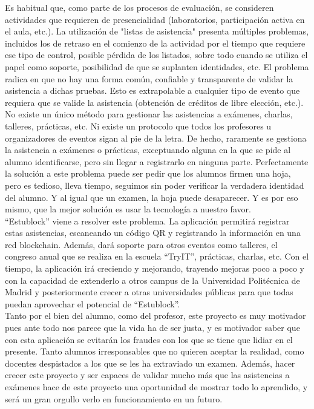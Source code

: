   Es habitual que, como parte de los procesos de evaluación, se consideren actividades que requieren de presencialidad (laboratorios, participación activa en el aula, etc.). La utilización de "listas de asistencia" presenta múltiples problemas, incluidos los de retraso en el comienzo de la actividad por el tiempo que requiere ese tipo de control, posible pérdida de los listados, sobre todo cuando se utiliza el papel como soporte, posibilidad de que se suplanten identidades, etc. El problema radica en que no hay una forma común, confiable y transparente de validar la asistencia a dichas pruebas. Esto es extrapolable a cualquier tipo de evento que requiera que se valide la asistencia (obtención de créditos de libre elección, etc.). \\

  No existe un único método para gestionar las asistencias a exámenes, charlas, talleres, prácticas, etc. Ni existe un protocolo que todos los profesores u organizadores de eventos sigan al pie de la letra. De hecho, raramente se gestiona la asistencia a exámenes o prácticas, exceptuando alguna en la que se pide al alumno identificarse, pero sin llegar a registrarlo en ninguna parte. Perfectamente la solución a este problema puede ser pedir que los alumnos firmen una hoja, pero es tedioso, lleva tiempo, seguimos sin poder verificar la verdadera identidad del alumno. Y al igual que un examen, la hoja puede desaparecer. Y es por eso mismo, que la mejor solución es usar la tecnología a nuestro favor. \\

``Estublock'' viene a resolver este problema. La aplicación permitirá registrar estas asistencias, escaneando un código QR y registrando la información en una red blockchain. Además, dará soporte para otros eventos como talleres, el congreso anual que se realiza en la escuela ``TryIT'', prácticas, charlas, etc. Con el tiempo, la aplicación irá creciendo y mejorando, trayendo mejoras poco a poco y con la capacidad de extenderlo a otros campus de la Universidad Politécnica de Madrid y posteriormente crecer a otras universidades públicas para que todas puedan aprovechar el potencial de ``Estublock''. \\

Tanto por el bien del alumno, como del profesor, este proyecto es muy motivador pues ante todo nos parece que la vida ha de ser justa, y es motivador saber que con esta aplicación se evitarán los fraudes con los que se tiene que lidiar en el presente. Tanto alumnos irresponsables que no quieren aceptar la realidad, como docentes despistados a los que se les ha extraviado un examen. Además, hacer crecer este proyecto y ser capaces de validar mucho más que las asistencias a exámenes hace de este proyecto una oportunidad de mostrar todo lo aprendido, y será un gran orgullo verlo en funcionamiento en un futuro. \\

